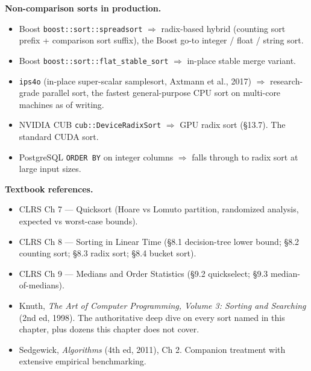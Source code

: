 \documentclass[11pt]{article}
\begin{document}
\begin{notebox}
\textbf{Non-comparison sorts in production.}
\begin{itemize}[leftmargin=*]
    \item Boost \texttt{boost::sort::spreadsort} $\Rightarrow$
          radix-based hybrid (counting sort prefix + comparison
          sort suffix), the Boost go-to integer / float / string
          sort.
    \item Boost \texttt{boost::sort::flat\_stable\_sort}
          $\Rightarrow$ in-place stable merge variant.
    \item \texttt{ips4o} (in-place super-scalar samplesort,
          Axtmann et al., 2017) $\Rightarrow$ research-grade
          parallel sort, the fastest general-purpose CPU sort
          on multi-core machines as of writing.
    \item NVIDIA CUB \texttt{cub::DeviceRadixSort} $\Rightarrow$
          GPU radix sort (\S13.7). The standard CUDA sort.
    \item PostgreSQL \texttt{ORDER BY} on integer columns
          $\Rightarrow$ falls through to radix sort at large
          input sizes.
\end{itemize}

\textbf{Textbook references.}
\begin{itemize}[leftmargin=*]
    \item CLRS Ch 7 --- Quicksort (Hoare vs Lomuto partition,
          randomized analysis, expected vs worst-case bounds).
    \item CLRS Ch 8 --- Sorting in Linear Time (\S8.1
          decision-tree lower bound; \S8.2 counting sort;
          \S8.3 radix sort; \S8.4 bucket sort).
    \item CLRS Ch 9 --- Medians and Order Statistics (\S9.2
          quickselect; \S9.3 median-of-medians).
    \item Knuth, \emph{The Art of Computer Programming, Volume
          3: Sorting and Searching} (2nd ed, 1998). The
          authoritative deep dive on every sort named in this
          chapter, plus dozens this chapter does not cover.
    \item Sedgewick, \emph{Algorithms} (4th ed, 2011), Ch 2.
          Companion treatment with extensive empirical
          benchmarking.
\end{itemize}
\end{notebox}
\end{document}
